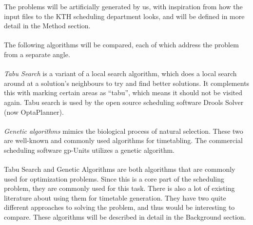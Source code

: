 \documentclass[titlepage,a4paper]{article}
\begin{document}
The problems will be artificially generated by us, with inspiration from how the input files to the KTH scheduling department looks, and will be defined in more detail in the Method section. \\\\
The following algorithms will be compared, each of which address the problem from a separate angle.\\\\
\emph{Tabu Search} is a variant of a local search algorithm, which does a local search around at a solution’s neighbours to try and find better solutions. It complements this with marking certain areas as “tabu”, which means it should not be visited again\cite{aTabuSearch07}. Tabu search is used by the open source scheduling software Drools Solver (now OptaPlanner)\cite{website:timetabling-software-survey}. \\\\
\emph{Genetic algorithms} mimics the biological process of natural selection. These two are well-known and commonly used algorithms for timetabling\cite{guidedSearch09}. The commercial scheduling software gp-Units utilizes a genetic algorithm\cite{website:timetabling-software-survey}.\\\\
Tabu Search and Genetic Algorithms are both algorithms that are commonly used for optimization problems. Since this is a core part of the scheduling problem, they are commonly used for this task. There is also a lot of existing literature about using them for timetable generation. They have two quite different approaches to solving the problem, and thus would be interesting to compare.
These algorithms will be described in detail in the Background section.

\pagebreak
\end{document}
